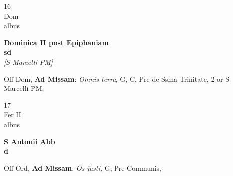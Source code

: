 \documentclass[10pt, openany]{book}
\begin{document}
        \begin{center}
            \begin{minipage}{3.5in}
                \vspace{2em}
                \begin{minipage}{0.5in}
                    {\Huge 16} \\
                    {\normalsize Dom} \\
                    {\normalsize albus}
                \end{minipage}
                \begin{minipage}{3.0in}
                    \textbf{ \large Dominica II post Epiphaniam \\
                    \textnormal{\normalsize sd}} \\ \textit{[S Marcelli PM]} \\ 
                \end{minipage}
                \begin{justify}Off Dom, \textbf{Ad Missam}: \textit{Omnis terra,} G, C, Pre de Ssma Trinitate, 2 or S Marcelli PM,  
                \end{justify}
            \end{minipage}
        \end{center}
    
        \begin{center}
            \begin{minipage}{3.5in}
                \vspace{2em}
                \begin{minipage}{0.5in}
                    {\Huge 17} \\
                    {\normalsize Fer II} \\
                    {\normalsize albus}
                \end{minipage}
                \begin{minipage}{3.0in}
                    \textbf{ \large S Antonii Abb \\
                    \textnormal{\normalsize d}} \\ 
                \end{minipage}
                \begin{justify}Off Ord, \textbf{Ad Missam}: \textit{Os justi,} G, Pre Communis,  
                \end{justify}
            \end{minipage}
        \end{center}
    
\end{document}
